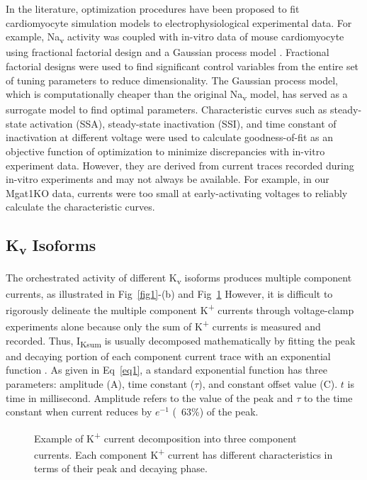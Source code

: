 \documentclass[10pt,letterpaper]{article}
\begin{document}
In the literature, optimization procedures have been proposed to fit cardiomyocyte simulation models to electrophysiological experimental data. For example, Na\textsubscript{v} activity was coupled with in-vitro data of mouse cardiomyocyte using fractional factorial design and a Gaussian process model \cite{du2015statistical}. Fractional factorial designs were used to find significant control variables from the entire set of tuning parameters to reduce dimensionality. The Gaussian process model, which is computationally cheaper than the original Na\textsubscript{v} model, has served as a surrogate model to find optimal parameters. Characteristic curves such as steady-state activation (SSA), steady-state inactivation (SSI), and time constant of inactivation at different voltage were used to calculate goodness-of-fit as an objective function of optimization to minimize discrepancies with in-vitro experiment data. However, they are derived from current traces recorded during in-vitro experiments and may not always be available. For example, in our Mgat1KO data, currents were too small at early-activating voltages to reliably calculate the characteristic curves.  

\subsection*{K\textsubscript{v} Isoforms}
The orchestrated activity of different K\textsubscript{v} isoforms produces multiple component currents, as illustrated in Fig~\ref{fig1}-(b) and Fig~\ref{fig3} However, it is difficult to rigorously delineate the multiple component K\textsuperscript{+} currents through voltage-clamp experiments alone because only the sum of K\textsuperscript{+} currents is measured and recorded. Thus, I\textsubscript{Ksum} is usually decomposed mathematically by fitting the peak and decaying portion of each component current trace with an exponential function \cite{brunet2004heterogeneous}. As given in Eq~\ref{eq1}, a standard exponential function has three parameters: amplitude ($\mathrm{A}$), time constant ($\tau$), and constant offset value ($\mathrm{C}$). $t$ is time in millisecond. Amplitude refers to the value of the peak and $\tau$ to the time constant when current reduces by $e^{-1}$ (~63\%) of the peak. 

\begin{figure}[!ht]
    \centering
    \caption{Example of K\textsuperscript{+} current decomposition into three component currents. Each component K\textsuperscript{+} current has different characteristics in terms of their peak and decaying phase.}
    \label{fig3}
\end{figure}
\end{document}

